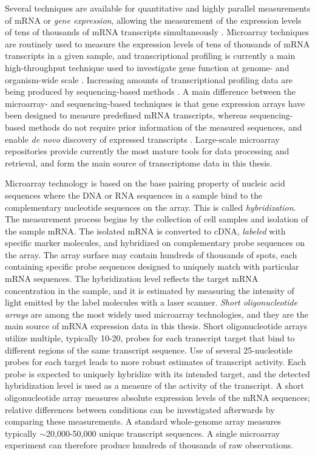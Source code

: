 Several techniques are available for quantitative and highly parallel
measurements of mRNA or {\it gene expression}, allowing the
measurement of the expression levels of tens of thousands of mRNA
transcripts simultaneously \citep{Bradford2010}. Microarray techniques
are routinely used to measure the expression levels of tens of
thousands of mRNA transcripts in a given sample, and transcriptional
profiling is currently a main high-throughput technique used to
investigate gene function at genome- and organism-wide scale
\citep{Gershon05, Yauk04}. Increasing amounts of transcriptional
profiling data are being produced by sequencing-based methods
\citep{Carninci2009}. A main difference between the microarray- and
sequencing-based techniques is that gene expression arrays have been
designed to measure predefined mRNA transcripts, whereas
sequencing-based methods do not require prior information of the
measured sequences, and enable {\it de novo} discovery of expressed
transcripts \citep{Bradford2010, Hoen08}. Large-scale microarray
repositories provide currently the most mature tools for data
processing and retrieval, and form the main source of transcriptome
data in this thesis.

Microarray technology is based on the base pairing property of nucleic
acid sequences where the DNA or RNA sequences in a sample bind to the
complementary nucleotide sequences on the array. This is called {\it
  hybridization}.  The measurement process begins by the collection of
cell samples and isolation of the sample mRNA. The isolated mRNA is
converted to cDNA, {\it labeled} with specific marker molecules, and
hybridized on complementary probe sequences on the array. The array
surface may contain hundreds of thousands of spots, each containing
specific probe sequences designed to uniquely match with particular
mRNA sequences. The hybridization level reflects the target mRNA
concentration in the sample, and it is estimated by measuring the
intensity of light emitted by the label molecules with a laser
scanner. {\it Short oligonucleotide arrays} \citep{Lockhart96} are
among the most widely used microarray technologies, and they are the
main source of mRNA expression data in this thesis.  Short
oligonucleotide arrays utilize multiple, typically 10-20, probes for
each transcript target that bind to different regions of the same
transcript sequence. Use of several 25-nucleotide probes for each
target leads to more robust estimates of transcript activity. Each
probe is expected to uniquely hybridize with its intended target, and
the detected hybridization level is used as a measure of the activity
of the transcript. A short oligonucleotide array measures absolute
expression levels of the mRNA sequences; relative differences between
conditions can be investigated afterwards by comparing these
measurements. A standard whole-genome array measures typically
\(\sim\)20,000-50,000 unique transcript sequences. A single microarray
experiment can therefore produce hundreds of thousands of raw
observations.

